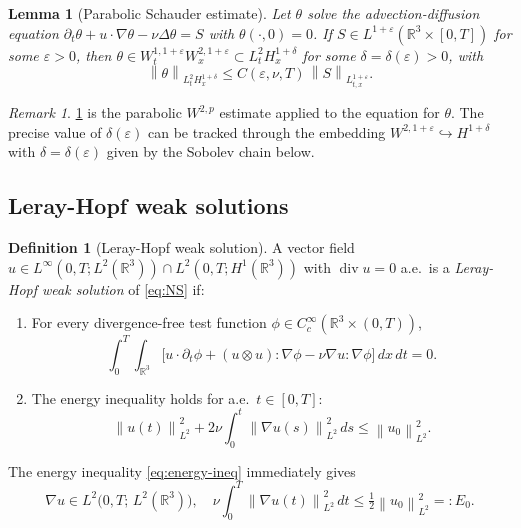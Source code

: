 \documentclass[12pt]{article}
\theoremstyle{plain}
\newtheorem{lemma}[theorem]{Lemma}
\theoremstyle{definition}
\newtheorem{definition}[theorem]{Definition}
\theoremstyle{remark}
\newtheorem{remark}[theorem]{Remark}
\newcommand{\R}{\mathbb{R}}
\newcommand{\norm}[1]{\left\|#1\right\|}
\newcommand{\pa}{\partial}
\newcommand{\eps}{\varepsilon}
\newcommand{\grad}{\nabla}
\newcommand{\Div}{\operatorname{div}}
\newcommand{\lap}{\Delta}
\begin{document}
\begin{lemma}[Parabolic Schauder estimate]\label{lem:parabolic-schauder}
  Let $\theta$ solve the advection-diffusion equation
  $\pa_t\theta + u\cdot\grad\theta - \nu\lap\theta = S$
  with $\theta(\cdot,0)=0$.
  If $S\in L^{1+\eps}(\R^3\times[0,T])$ for some $\eps>0$,
  then $\theta\in W^{1,1+\eps}_t W^{2,1+\eps}_x\subset L^2_t H^{1+\delta}_x$
  for some $\delta=\delta(\eps)>0$, with
  \[
    \norm{\theta}_{L^2_t H^{1+\delta}_x} \leq C(\eps,\nu,T)\,\norm{S}_{L^{1+\eps}_{t,x}}.
  \]
\end{lemma}

\begin{remark}
  \cref{lem:parabolic-schauder} is the parabolic $W^{2,p}$ estimate applied to
  the equation for $\theta$.
  The precise value of $\delta(\eps)$ can be tracked through the embedding
  $W^{2,1+\eps}\hookrightarrow H^{1+\delta}$ with $\delta=\delta(\eps)$ given
  by the Sobolev chain below.
\end{remark}

\subsection{Leray-Hopf weak solutions}

\begin{definition}[Leray-Hopf weak solution]\label{def:leray-hopf}
  A vector field $u\in L^\infty(0,T;L^2(\R^3))\cap L^2(0,T;H^1(\R^3))$ with
  $\Div u=0$ a.e.\ is a \emph{Leray-Hopf weak solution} of \eqref{eq:NS} if:
  \begin{enumerate}[label=(\roman*)]
    \item For every divergence-free test function $\phi\in C^\infty_c(\R^3\times(0,T))$,
      \[
        \int_0^T\int_{\R^3}
          \bigl[u\cdot\pa_t\phi + (u\otimes u):\grad\phi
          - \nu\grad u:\grad\phi\bigr]\,dx\,dt = 0.
      \]
    \item The energy inequality holds for a.e.\ $t\in[0,T]$:
      \begin{equation}\label{eq:energy-ineq}
        \norm{u(t)}_{L^2}^2 + 2\nu\int_0^t\norm{\grad u(s)}_{L^2}^2\,ds
        \leq \norm{u_0}_{L^2}^2.
      \end{equation}
  \end{enumerate}
\end{definition}

The energy inequality \eqref{eq:energy-ineq} immediately gives
\begin{equation}\label{eq:energy-bound}
  \grad u \in L^2\bigl(0,T;\,L^2(\R^3)\bigr),
  \quad
  \nu\int_0^T\norm{\grad u(t)}_{L^2}^2\,dt
  \leq \tfrac{1}{2}\norm{u_0}_{L^2}^2 =: E_0.
\end{equation}
\end{document}
